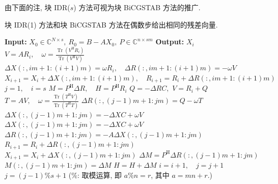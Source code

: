 {由下面的注, 块 IDR($s$) 方法可视为块 BiCGSTAB 方法的推广.}
\par{}
\begin{Remark}\label{rem:block-idr-bicgstab-equivalence}
{块 IDR(1) 方法和块 BiCGSTAB 方法在偶数步给出相同的残差向量.}
\end{Remark}
\begin{algorithm}[H]\caption{{块 IDR($s$) 方法}}\label{alg:block-idr}\begin{algorithmic}[1]
\Statex\textbf{Input:} $X_0\in\mathbb C^{N\times s},\ R_0=B-AX_0,\ P\in\mathbb C^{n\times sm}$
\Statex\textbf{Output:} $X_i$
\State $V=AR_i,\quad\omega=\frac{\operatorname{Tr}(V^{\mathrm H}R_i)}{\operatorname{Tr}(V^{\mathrm H}V)}$
\State $\Delta X(:,im+1:(i+1)m)=\omega R_i,\quad\Delta R(:,im+1:(i+1)m)=-\omega V$
\State $X_{i+1}=X_i+\Delta X(:,im+1:(i+1)m),\quad R_{i+1}=R_i+\Delta R(:,im+1:(i+1)m)$
\EndFor
\State $j=1,\quad i=s$
\State $M=P^{\mathrm H}\Delta R,\quad H=P^{\mathrm H}R_i$
\State $Q=-\Delta RC,$
\State $V=R_i+Q$
\State $T=AV,\quad\omega=\frac{\operatorname{Tr}(T^{\mathrm H}V)}{\operatorname{Tr}(T^{\mathrm H}T)}$
\State $\Delta R(:,(j-1)m+1:jm)=Q-\omega T$
\State $\Delta X(:,(j-1)m+1:jm)=-\Delta XC+\omega V$
\Else
\State $\Delta X(:,(j-1)m+1:jm)=-\Delta XC+\omega V$
\State $\Delta R(:,(j-1)m+1:jm)=-A\Delta X(:,(j-1)m+1:jm)$
\EndIf
\State $R_{i+1}=R_i+\Delta R(:,(j-1)m+1:jm)$
\State $X_{i+1}=X_i+\Delta X(:,(j-1)m+1:jm)$
\State $\Delta M=P^{\mathrm H}\Delta R(:,(j-1)m+1:jm)$
\State $M(:,(j-1)m+1:jm)=\Delta M$
\State $H=H+\Delta M$
\State $i=i+1,\quad j=j+1$
\State $j=(j-1)\%s+1$ ({$\%$: 取模运算, 即 $a\%n=r$, 其中 $a=mn+r$.})
\EndFor\EndWhile\end{algorithmic}\end{algorithm}
